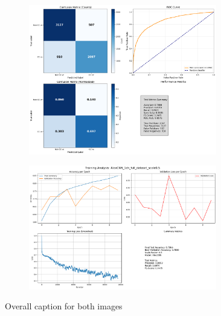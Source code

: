 \documentclass{pracalicmgr}
\begin{document}
\newpage

\begin{figure}[H]
    \centering
    \begin{subfigure}{\textwidth}
        \centering
        \includegraphics[width=0.9\textwidth]{src/AlexCNN_1ch_full_dataset_scale05.png}
        \label{fig:full5sub1}
    \end{subfigure}
    
    \vspace{1cm}
    
    \begin{subfigure}{\textwidth}
        \centering
        \includegraphics[width=0.9\textwidth]{src/AlexCNN_1ch_full_dataset_scale05loss.png}
        \label{fig:full5sub2}
    \end{subfigure}
    \caption{Overall caption for both images}
    \label{fig:full5stacked}
\end{figure}
\end{document}
